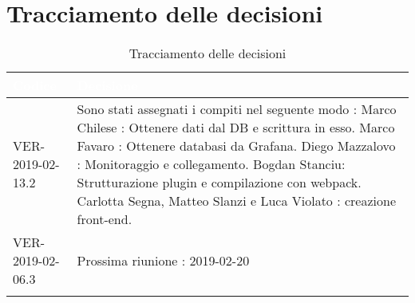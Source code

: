 
\section{Tracciamento delle decisioni}

\begin{longtable}{|C{.40\textwidth}|C{.60\textwidth}|}
\hline
{}\textbf{\textcolor{white}{Codice}} & \textbf{\textcolor{white}{Decisione}}\\
\hline
VER-2019-02-13.2 &  Sono stati assegnati i compiti nel seguente modo : 
Marco Chilese : Ottenere dati dal DB e scrittura in esso.
Marco Favaro : Ottenere databasi da Grafana.
Diego Mazzalovo : Monitoraggio e collegamento.
Bogdan Stanciu: Strutturazione plugin e compilazione con webpack.
Carlotta Segna, Matteo Slanzi e Luca Violato : creazione front-end.\\
\hline
VER-2019-02-06.3 & Prossima riunione : 2019-02-20 \\
\hline

\caption{Tracciamento delle decisioni}
\end{longtable}
